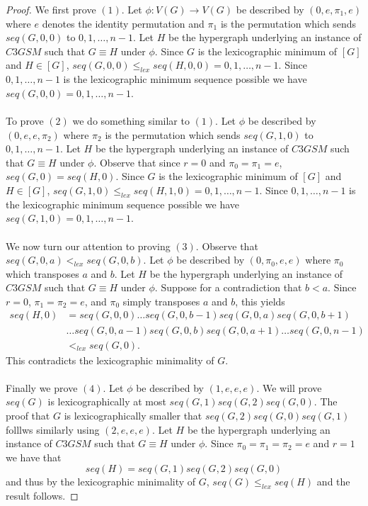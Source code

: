 \begin{proof}
We first prove $(1)$. Let $\phi : V(G) \rightarrow V(G)$ be described by $(0,e,\pi_1, e)$ where $e$ denotes the identity permutation and $\pi_1$ is the permutation which sends $seq(G,0,0)$ to $0,1,\dots,n-1$. Let $H$ be the hypergraph underlying an instance of $C3GSM$ such that $G \equiv H$ under $\phi$. Since $G$ is the lexicographic minimum of $[G]$ and $H \in [G]$, $seq(G,0,0) \leq_{lex} seq(H,0,0) = 0,1,\dots,n-1$. Since $0,1,\dots,n-1$ is the lexicographic minimum sequence possible we have $seq(G,0,0) = 0,1,\dots,n-1$.
\paragraph{}
To prove $(2)$ we do something similar to $(1)$. Let $\phi$ be described by $(0,e,e,\pi_2)$ where $\pi_2$ is the permutation which sends $seq(G,1,0)$ to $0,1,\dots,n-1$. Let $H$ be the hypergraph underlying an instance of $C3GSM$ such that $G \equiv H$ under $\phi$. Observe that since $r = 0$ and $\pi_0 = \pi_1 = e$, $seq(G,0) = seq(H,0)$. Since $G$ is the lexicographic minimum of $[G]$ and $H \in [G]$, $seq(G,1,0) \leq_{lex} seq(H,1,0) = 0,1,\dots,n-1$. Since $0,1,\dots,n-1$ is the lexicographic minimum sequence possible we have $seq(G,1,0) = 0,1,\dots,n-1$.
\paragraph{}
We now turn our attention to proving $(3)$. Observe that $seq(G,0,a) <_{lex} seq(G,0,b)$. Let $\phi$ be described by $(0,\pi_0,e,e)$ where $\pi_0$ which transposes $a$ and $b$. Let $H$ be the hypergraph underlying an instance of $C3GSM$ such that $G \equiv H$ under $\phi$. Suppose for a contradiction that $b<a$. Since $r=0$, $\pi_1=\pi_2=e$, and $\pi_0$ simply transposes $a$ and $b$, this yields 
\begin{align*}seq(H,0) &= seq(G,0,0) \dots seq(G,0,b-1)seq(G,0,a)seq(G,0,b+1)\\
&\dots seq(G,0,a-1) seq(G,0,b) seq(G,0,a+1) \dots seq(G,0,n-1) \\
&<_{lex} seq(G,0).\end{align*}
This contradicts the lexicographic minimality of $G$.
\paragraph{}
Finally we prove $(4)$. Let $\phi$ be described by $(1,e,e,e)$. We will prove $seq(G)$ is lexicographically at most $seq(G,1)seq(G,2)seq(G,0)$. The proof that $G$ is lexicographically smaller that $seq(G,2)seq(G,0)seq(G,1)$ folllws similarly using $(2,e,e,e)$. Let $H$ be the hypergraph underlying an instance of $C3GSM$ such that $G \equiv H$ under $\phi$. Since $\pi_0=\pi_1=\pi_2=e$ and $r=1$ we have that
$$seq(H) = seq(G,1)seq(G,2)seq(G,0)$$
and thus by the lexicographic minimality of $G$, $seq(G) \leq_{lex} seq(H)$ and the result follows.
\end{proof}
